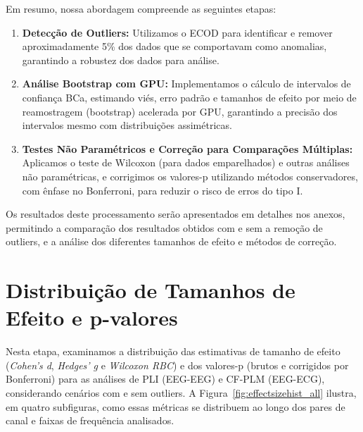 Em resumo, nossa abordagem compreende as seguintes etapas:
\begin{enumerate}
    \item \textbf{Detecção de Outliers:} Utilizamos o ECOD para identificar e remover aproximadamente 5\% dos dados que se comportavam como anomalias, garantindo a robustez dos dados para análise.
    \item \textbf{Análise Bootstrap com GPU:} Implementamos o cálculo de intervalos de confiança BCa, estimando viés, erro padrão e tamanhos de efeito por meio de reamostragem (bootstrap) acelerada por GPU, garantindo a precisão dos intervalos mesmo com distribuições assimétricas.
    \item \textbf{Testes Não Paramétricos e Correção para Comparações Múltiplas:} Aplicamos o teste de Wilcoxon (para dados emparelhados) e outras análises não paramétricas, e corrigimos os valores-p utilizando métodos conservadores, com ênfase no Bonferroni, para reduzir o risco de erros do tipo I.
\end{enumerate}

Os resultados deste processamento serão apresentados em detalhes nos anexos, permitindo a comparação dos resultados obtidos com e sem a remoção de outliers, e a análise dos diferentes tamanhos de efeito e métodos de correção.

\section{Distribuição de Tamanhos de Efeito e p-valores}
\label{sec:effect_size_distribution}

Nesta etapa, examinamos a distribuição das estimativas de tamanho de efeito (\emph{Cohen's d}, \emph{Hedges' g} e \emph{Wilcoxon RBC}) e dos valores-p (brutos e corrigidos por Bonferroni) para as análises de PLI (EEG-EEG) e CF-PLM (EEG-ECG), considerando cenários com e sem outliers. A Figura~\ref{fig:effectsizehist_all} ilustra, em quatro subfiguras, como essas métricas se distribuem ao longo dos pares de canal e faixas de frequência analisados.

